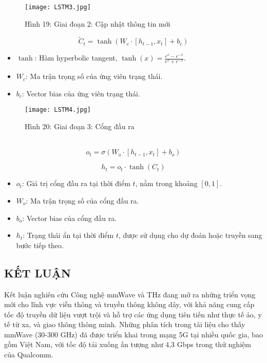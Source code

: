 \documentclass[a4paper,13pt]{article}
\begin{document}
\clearpage
\begin{figure}[htbp]
    \centering
    \texttt{[image: LSTM3.jpg]}
    \caption*{Hình 19: Giai đoạn 2: Cập nhật thông tin mới \cite{key10} }
    \label{fig:model}
\end{figure}


\begin{equation}
\tilde{C}_t = \tanh(W_c \cdot [h_{t-1}, x_t] + b_c)  \tag{14}\label{eq:candidate_cell_state}
\end{equation}

\begin{itemize}
    \item \( \tanh \): Hàm hyperbolic tangent, \( \tanh(x) = \frac{e^x - e^{-x}}{e^x + e^{-x}} \).
    \item \( W_c \): Ma trận trọng số của ứng viên trạng thái.
    \item \( b_c \): Vector bias của ứng viên trạng thái.
\end{itemize}

\begin{figure}[htbp]
    \centering
    \texttt{[image: LSTM4.jpg]}
    \caption*{Hình 20: Giai đoạn 3: Cổng đầu ra\cite{key10} }
    \label{fig:model}
\end{figure}\\

\begin{equation}
o_t = \sigma(W_o \cdot [h_{t-1}, x_t] + b_o) \tag{15}\label{eq:output_gate}
\end{equation}

\begin{equation}
h_t = o_t \cdot \tanh(C_t) \tag{16}\label{eq:hidden_state}
\end{equation}
\begin{itemize}
    \item \( o_t \): Giá trị cổng đầu ra tại thời điểm \( t \), nằm trong khoảng \([0, 1]\).
    \item \( W_o \): Ma trận trọng số của cổng đầu ra.
    \item \( b_o \): Vector bias của cổng đầu ra.
    \item \( h_t \): Trạng thái ẩn tại thời điểm \( t \), được sử dụng cho dự đoán hoặc truyền sang bước tiếp theo.
\end{itemize}
\begin{center}
    \section{KẾT LUẬN}
\end{center}
Kết luận nghiên cứu
Công nghệ mmWave và THz đang mở ra những triển vọng mới cho lĩnh vực viễn thông và truyền thông không dây, với khả năng cung cấp tốc độ truyền dữ liệu vượt trội và hỗ trợ các ứng dụng tiên tiến như thực tế ảo, y tế từ xa, và giao thông thông minh. Những phân tích trong tài liệu cho thấy mmWave (30-300 GHz) đã được triển khai trong mạng 5G tại nhiều quốc gia, bao gồm Việt Nam, với tốc độ tải xuống ấn tượng như 4,3 Gbps trong thử nghiệm của Qualcomm. \\
\end{document}
